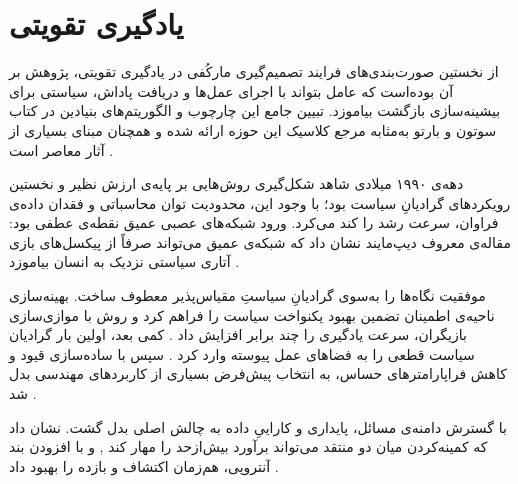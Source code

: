 \section{یادگیری تقویتی}\label{sec:rl_lit}


از نخستین صورت‌بندی‌های فرایند تصمیم‌گیری مارکُفی در یادگیری تقویتی، پژوهش بر آن بوده‌است که عامل بتواند با اجرای عمل‌ها و دریافت پاداش، سیاستی برای بیشینه‌سازی بازگشت بیاموزد. تبیین جامع این چارچوب و الگوریتم‌های بنیادین در کتاب سوتون و بارتو به‌مثابه مرجع کلاسیک این حوزه ارائه شده و همچنان مبنای بسیاری از آثار معاصر است \cite{SuttonBarto2018}. %


دهه‌‌ی ۱۹۹۰ میلادی شاهد شکل‌گیری روش‌هایی بر پایه‌ی ارزش
 نظیر  و نخستین رویکردهای گرادیانِ سیاست بود؛ با وجود این، محدودیت توان محاسباتی و فقدان داده‌ی فراوان، سرعت رشد را کند می‌کرد. ورود شبکه‌های عصبی عمیق
  نقطه‌ی عطفی بود: مقاله‌ی معروف دیپ‌مایند
  نشان داد که شبکه‌ی  عمیق
   می‌تواند صرفاً از پیکسل‌های بازی آتاری سیاستی نزدیک به انسان بیاموزد \cite{Mnih2015}. %


موفقیت  نگاه‌ها را به‌سوی گرادیانِ سیاستِ مقیاس‌پذیر معطوف ساخت. بهینه‌سازی ناحیه‌ی اطمینان
   تضمین بهبود یکنواخت سیاست را فراهم کرد \cite{Schulman2015TRPO} و روش  با موازی‌سازی بازیگران، سرعت یادگیری را چند برابر افزایش داد \cite{Mnih2016A3C}. %
کمی بعد،  اولین بار گرادیان سیاست قطعی را به فضاهای عمل پیوسته وارد کرد \cite{lillicrap2019continuouscontroldeepreinforcement}. %
سپس  با ساده‌سازی قیود  و کاهش فراپارامترهای حساس، به انتخاب پیش‌فرض بسیاری از کاربردهای مهندسی بدل شد \cite{Schulman2017PPO}. %


با گسترش دامنه‌ی مسائل، پایداری و کاراییِ داده به چالش اصلی بدل گشت.  نشان داد که کمینه‌کردن میان دو منتقد می‌تواند برآورد بیش‌از‌حد  را مهار کند \cite{Fujimoto2018TD3}, و  با افزودن بند آنتروپی، هم‌زمان اکتشاف و بازده را بهبود داد \cite{Haarnoja2018SAC}. %





